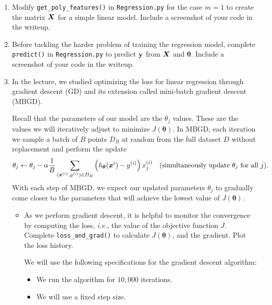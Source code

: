 \documentclass[11pt]{article}
\begin{document}
\begin{enumerate}[resume]
\item  {} Modify \verb|get_poly_features()| in \verb|Regression.py| for the case $m=1$ to create the matrix $\boldsymbol{X}$ for a simple linear model. Include a screenshot of your code in the writeup. 

\item  {} Before tackling the harder problem of training the regression model, complete \verb|predict()| in \verb|Regression.py| to predict ${\mathbf y}$ from $\boldsymbol{X}$ and $\boldsymbol{\theta}$. Include a screenshot of your code in the writeup. 


\item In the lecture, we studied optimizing the loss for linear regression through gradient descent (GD) and its extension called mini-batch gradient descent (MBGD). 

Recall that the parameters of our model are the $\theta_j$ values. These are the values we will iteratively adjust to minimize $J(\boldsymbol{\theta})$. In MBGD, each iteration we sample a batch of $B$ points $D_B$ at random from the full dataset $D$ without replacement and perform the update
\begin{equation*}
\theta_j \leftarrow \theta_j - \alpha \frac{1}{B}\sum_{(\boldsymbol x^{(i)}, y^{(i)})\in D_B} \left( h_{\boldsymbol{\theta}}(\boldsymbol{x}^{i}) - y^{(i)} \right) x^{(i)}_{j} \textrm{\quad (simultaneously update $\theta_j$ for all $j$)}.
\end{equation*}
With each step of MBGD, we expect our updated parameters $\theta_j$ to gradually come closer to the parameters that will achieve the lowest value of $J(\boldsymbol{\theta})$.

\begin{itemize}

\item {} As we perform gradient descent, it is helpful to monitor the convergence by computing the loss, \emph{i.e.}, the value of the objective function $J$. Complete \verb|loss_and_grad()| to calculate $J(\boldsymbol{\theta})$, and the gradient. Plot the loss history. 

We will use the following specifications for the gradient descent algorithm:
\begin{itemize}
\item We run the algorithm for $10,000$ iterations.
\item We will use a fixed step size. 
\end{itemize}



\end{itemize}
\end{enumerate}
\end{document}
